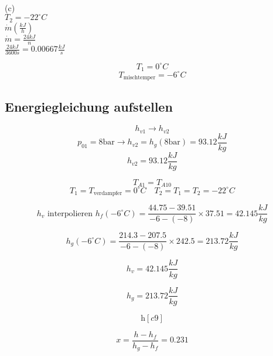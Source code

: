 (c) \\
$T_2 = -22^\circ C$ \\
$\dot{m} \left( \frac{kJ}{h} \right)$ \\
$\dot{m} = \frac{24 kJ}{n}$ \\
$\frac{24 kJ}{3600 s} = 0.00667 \frac{kJ}{s}$

\[
T_1 = 0^\circ C
\]
\[
T_{\text{mischtemper}} = -6^\circ C
\]

\subsection*{Energiegleichung aufstellen}

\[
h_{v1} \rightarrow h_{v2}
\]
\[
p_{01} = 8 \text{bar} \rightarrow h_{v2} = h_{g} (8 \text{bar}) = 93.12 \frac{kJ}{kg}
\]
\[
h_{v2} = 93.12 \frac{kJ}{kg}
\]

\[
T_{A1} = T_{A10}
\]
\[
T_{1} = T_{\text{verdampfer}} = 0^\circ C \quad T_{2} = T_{1} = T_{2} = -22^\circ C
\]

\[
h_{v} \text{ interpolieren } h_{f} (-6^\circ C) = \frac{44.75 - 39.51}{-6 - (-8)} \times 37.51 = 42.145 \frac{kJ}{kg}
\]

\[
h_{g} (-6^\circ C) = \frac{214.3 - 207.5}{-6 - (-8)} \times 242.5 = 213.72 \frac{kJ}{kg}
\]

\[
h_{v} = 42.145 \frac{kJ}{kg}
\]

\[
h_{g} = 213.72 \frac{kJ}{kg}
\]

\[
\text{h} \left[ c9 \right]
\]

\[
x = \frac{h - h_f}{h_g - h_f} = 0.231
\]